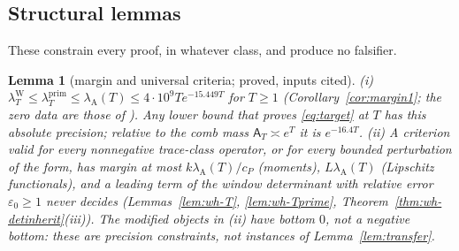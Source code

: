 \documentclass[11pt]{amsart}
\newtheorem{lemma}[theorem]{Lemma}
\theoremstyle{definition}
\theoremstyle{remark}
\newcommand{\lamP}{\lambda^{\mathrm{prim}}_T}
\newcommand{\lamW}{\lambda^{\mathrm W}_T}
\newcommand{\lamA}{\lambda_{\mathrm A}(T)}
\newcommand{\Aconst}{\mathsf A_T}
\begin{document}
\subsection{Structural lemmas}

These constrain every proof, in whatever class, and produce no falsifier.

\begin{lemma}[margin and universal criteria; proved, inputs cited]\label{lem:shape-margin}
\emph{(i)} $\lamW\le\lamP\le\lamA\le4\cdot10^9Te^{-15.449T}$ for $T\ge1$ (Corollary~\ref{cor:margin1}; the zero data are those of
\cite{PlattTrudgian2021}). Any lower bound that proves \eqref{eq:target} at $T$ has this absolute precision; relative to the comb mass
$\Aconst\asymp e^T$ it is $e^{-16.4T}$. \emph{(ii)} A criterion valid for every nonnegative trace-class operator, or for every bounded
perturbation of the form, has margin at most $k\lamA/c_P$ (moments), $L\lamA$ (Lipschitz functionals), and a leading term of the window
determinant with relative error $\varepsilon_0\ge1$ never decides (Lemmas~\ref{lem:wh-T}, \ref{lem:wh-Tprime},
Theorem~\ref{thm:wh-detinherit}(iii)). The modified objects in (ii) have bottom $0$, not a negative bottom: these are precision
constraints, not instances of Lemma~\ref{lem:transfer}.
\end{lemma}
\end{document}
